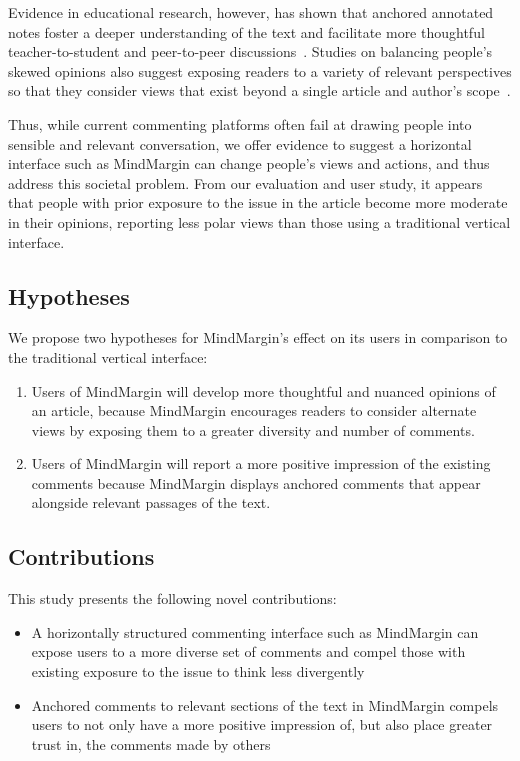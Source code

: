 Evidence in educational research, however, has shown that anchored annotated notes foster a deeper understanding of the text and facilitate more thoughtful teacher-to-student and peer-to-peer discussions~\cite{AnnotationsStudents,NB}. Studies on balancing people’s skewed opinions also suggest exposing readers to a variety of relevant perspectives so that they consider views that exist beyond a single article and author’s scope~\cite{Politics,NewsCube,ConsiderIt}. 

Thus, while current commenting platforms often fail at drawing people into sensible and relevant conversation, we offer evidence to suggest a horizontal interface such as MindMargin can change people’s views and actions, and thus address this societal problem. From our evaluation and user study, it appears that people with prior exposure to the issue in the article become more moderate in their opinions, reporting less polar views than those using a traditional vertical interface.

\subsection{Hypotheses}
We propose two hypotheses for MindMargin's effect on its users in comparison to the traditional vertical interface:
\begin{enumerate}
\item Users of MindMargin will develop more thoughtful and nuanced opinions of an article, because MindMargin encourages readers to consider alternate views by exposing them to a greater diversity and number of comments.
\item Users of MindMargin will report a more positive impression of the existing comments because MindMargin displays anchored comments that appear alongside relevant passages of the text.
\end{enumerate}

\subsection{Contributions}
This study presents the following novel contributions:
\begin{itemize}
\item A horizontally structured commenting interface such as MindMargin can expose users to a more diverse set of comments and compel those with existing exposure to the issue to think less divergently
\item Anchored comments to relevant sections of the text in MindMargin compels users to not only have a more positive impression of, but also place greater trust in, the comments made by others
\end{itemize}

